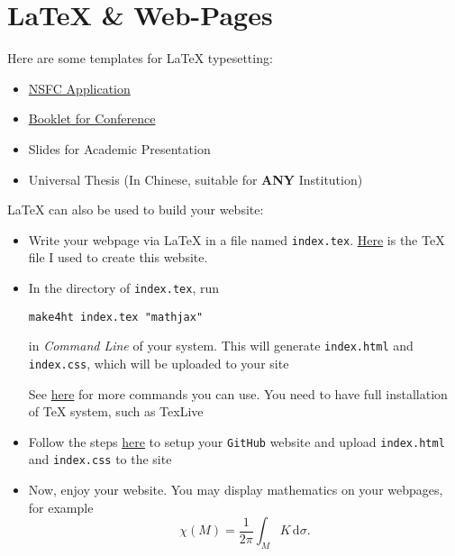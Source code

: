 \documentclass[12pt]{amsproc}
\begin{document}
\section{\LaTeX{} \& Web-Pages}

Here are some templates for \LaTeX{} typesetting:
\begin{itemize}
\item \href{https://lausb.github.io/down/NSFC.zip}{NSFC Application}
\item \href{https://lausb.github.io/down/meet.zip}{Booklet for Conference}
\item Slides for Academic Presentation
\item Universal Thesis (In Chinese, suitable for \textbf{ANY} Institution)
\end{itemize}

\LaTeX{} can also be used to build your website:
\begin{itemize}
\item Write your webpage via \LaTeX{} in a file named \verb|index.tex|. \href{https://lausb.github.io/down/index.tex}{Here} is the \TeX{} file I used to create this website.
\item In the directory of \verb|index.tex|, run


 \verb|make4ht index.tex "mathjax"|
  
in \emph{Command Line} of your system. This will generate \verb|index.html| and \verb|index.css|, which will be uploaded to your site
 
See \href{https://tug.org/tex4ht}{here} for more commands you can use.  
 You need to have full installation of \TeX{} system, such as TexLive
\item Follow the steps \href{https://docs.github.com/en/pages/quickstart}{here} to setup your \verb|GitHub| website and upload \verb|index.html| and \verb|index.css| to the site
\item Now, enjoy your website. You may display mathematics on your webpages, for example
\[
\chi(M)=\frac{1}{2\pi}\int_MK\,\mathrm{d}\sigma\text{.}
\]

\end{itemize}
\end{document}
